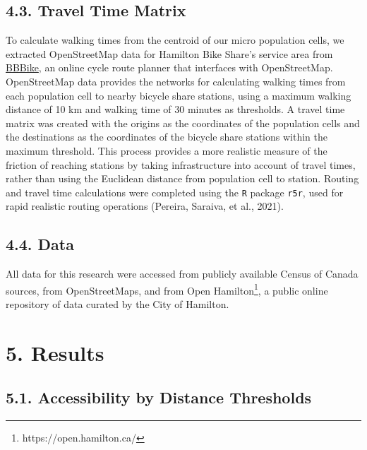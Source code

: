 \documentclass[]{elsarticle} %
\begin{document}
\hypertarget{travel-time-matrix}{%
\subsection{4.3. Travel Time Matrix}\label{travel-time-matrix}}

To calculate walking times from the centroid of our micro population
cells, we extracted OpenStreetMap data for Hamilton Bike Share's service
area from \href{https://download.bbbike.org/osm/bbbike/}{BBBike}, an
online cycle route planner that interfaces with OpenStreetMap.
OpenStreetMap data provides the networks for calculating walking times
from each population cell to nearby bicycle share stations, using a
maximum walking distance of 10 km and walking time of 30 minutes as
thresholds. A travel time matrix was created with the origins as the
coordinates of the population cells and the destinations as the
coordinates of the bicycle share stations within the maximum threshold.
This process provides a more realistic measure of the friction of
reaching stations by taking infrastructure into account of travel times,
rather than using the Euclidean distance from population cell to
station. Routing and travel time calculations were completed using the
\texttt{R} package \texttt{r5r}, used for rapid realistic routing
operations (Pereira, Saraiva, et al., 2021).

\hypertarget{data}{%
\subsection{4.4. Data}\label{data}}

All data for this research were accessed from publicly available Census
of Canada sources, from OpenStreetMaps, and from Open Hamilton\footnote{https://open.hamilton.ca/},
a public online repository of data curated by the City of Hamilton.

\hypertarget{results}{%
\section{5. Results}\label{results}}

\hypertarget{accessibility-by-distance-thresholds}{%
\subsection{5.1. Accessibility by Distance
Thresholds}\label{accessibility-by-distance-thresholds}}
\end{document}
